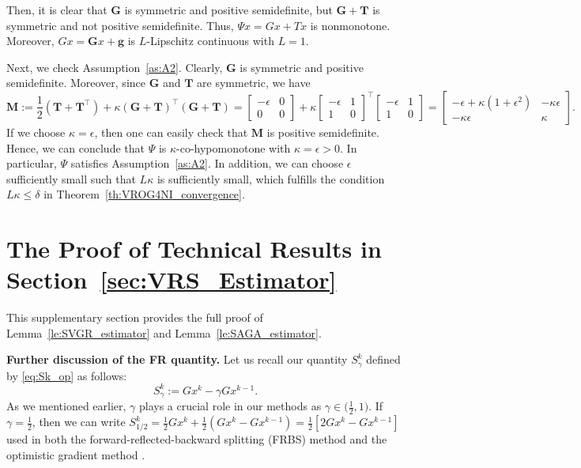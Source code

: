\documentclass{article}
\newcommand{\mbf}[1]{\mathbf{#1}}
\newcommand{\beforesec}{\vspace{-1.5ex}}
\newcommand{\aftersec}{\vspace{-1.25ex}}
\theoremstyle{plain}
\theoremstyle{definition}
\theoremstyle{remark}
\begin{document}
Then, it is clear that $\mbf{G}$ is symmetric and positive semidefinite, but $\mbf{G}+\mbf{T}$ is symmetric and not positive semidefinite.
Thus, $\Psi{x} = Gx + Tx$ is nonmonotone.
Moreover, $Gx = \mbf{G}x + \mbf{g}$ is $L$-Lipschitz continuous with $L = 1$.

Next, we check Assumption~\ref{as:A2}.
Clearly, $\mbf{G}$ is symmetric and positive semidefinite.
Moreover, since $\mbf{G}$ and $\mbf{T}$ are symmetric, we have 
\begin{equation*}
\mbf{M} := \frac{1}{2}(\mbf{T} + \mbf{T}^{\top}) + \kappa(\mbf{G} + \mbf{T})^{\top}(\mbf{G} + \mbf{T}) = 
\begin{bmatrix}-\epsilon & 0 \\ 0 & 0\end{bmatrix} + \kappa\begin{bmatrix}-\epsilon & 1 \\ 1 & 0\end{bmatrix}^{\top}\begin{bmatrix}-\epsilon & 1 \\ 1 & 0\end{bmatrix} 
=  \begin{bmatrix}-\epsilon + \kappa(1 + \epsilon^2) & -\kappa\epsilon \\ -\kappa \epsilon & \kappa\end{bmatrix}.
\end{equation*}
If we choose $\kappa = \epsilon$, then one can easily check that $\mbf{M}$ is positive semidefinite.
Hence, we can conclude that $\Psi$ is $\kappa$-co-hypomonotone with $\kappa = \epsilon > 0$.
In particular, $\Psi$ satisfies Assumption~\ref{as:A2}.
In addition, we can choose $\epsilon$ sufficiently small such that $L\kappa$ is sufficiently small, which fulfills the condition $L\kappa \leq \delta$ in Theorem~\ref{th:VROG4NI_convergence}.

 
\beforesec
\section{The Proof of Technical Results in Section~\ref{sec:VRS_Estimator}}
\aftersec
This supplementary section provides the full proof of Lemma~\ref{le:SVGR_estimator} and Lemma~\ref{le:SAGA_estimator}.

\textbf{Further discussion of the FR quantity.}
Let us recall our quantity $S^k_{\gamma}$ defined by \eqref{eq:Sk_op} as follows: 
\begin{equation}\label{eq:Sk_op_sup}
S_{\gamma}^k := Gx^k  - \gamma Gx^{k-1}.
\tag{FRO}
\end{equation}
As we mentioned earlier, $\gamma$ plays a crucial role in our methods  as $\gamma \in \big(\frac{1}{2}, 1\big)$.
If $\gamma = \frac{1}{2}$, then we can write $S_{1/2}^k = \frac{1}{2}Gx^k + \frac{1}{2}(Gx^k - Gx^{k-1}) = \frac{1}{2}[ 2Gx^k - Gx^{k-1}]$ used in both the forward-reflected-backward splitting (FRBS) method \citep{malitsky2020forward} and the optimistic gradient method  \citep{daskalakis2018training}.
\end{document}
